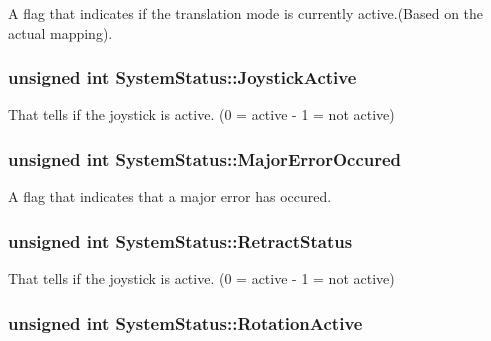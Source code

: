 A flag that indicates if the translation mode is currently active.(Based on the actual mapping). 

\subsubsection[{\texorpdfstring{Joystick\+Active}{JoystickActive}}]{\setlength{\rightskip}{0pt plus 5cm}unsigned int System\+Status\+::\+Joystick\+Active}\hypertarget{struct_system_status_afff6d14c02523d89ba0fdc22c8a8825f}{}\label{struct_system_status_afff6d14c02523d89ba0fdc22c8a8825f}


That tells if the joystick is active. (0 = active -\/ 1 = not active) 

\subsubsection[{\texorpdfstring{Major\+Error\+Occured}{MajorErrorOccured}}]{\setlength{\rightskip}{0pt plus 5cm}unsigned int System\+Status\+::\+Major\+Error\+Occured}\hypertarget{struct_system_status_a6c7ed26ae5b10f514f9f10adb5cb2839}{}\label{struct_system_status_a6c7ed26ae5b10f514f9f10adb5cb2839}


A flag that indicates that a major error has occured. 

\subsubsection[{\texorpdfstring{Retract\+Status}{RetractStatus}}]{\setlength{\rightskip}{0pt plus 5cm}unsigned int System\+Status\+::\+Retract\+Status}\hypertarget{struct_system_status_abae94c0687a083017956476f140ad34d}{}\label{struct_system_status_abae94c0687a083017956476f140ad34d}


That tells if the joystick is active. (0 = active -\/ 1 = not active) 

\subsubsection[{\texorpdfstring{Rotation\+Active}{RotationActive}}]{\setlength{\rightskip}{0pt plus 5cm}unsigned int System\+Status\+::\+Rotation\+Active}\hypertarget{struct_system_status_a4f743187089a28cd66438e804c3dc8cb}{}\label{struct_system_status_a4f743187089a28cd66438e804c3dc8cb}


